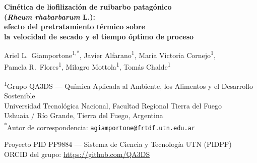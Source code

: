\documentclass[12pt, a4paper]{article}
\begin{document}
\thispagestyle{empty}
\begin{center}
\end{center}
\vspace{1em}

\begin{center}
{\LARGE\bfseries Cinética de liofilización de ruibarbo patagónico\\
(\textit{Rheum rhabarbarum} L.):\\
efecto del pretratamiento térmico sobre\\
la velocidad de secado y el tiempo óptimo de proceso}
\vspace{1.5em}

{\large
Ariel L.\ Giamportone\textsuperscript{1,*},
Javier Alfarano\textsuperscript{1},
María Victoria Cornejo\textsuperscript{1},\\
Pamela R.\ Flores\textsuperscript{1},
Milagro Mottola\textsuperscript{1},
Tomás Chalde\textsuperscript{1}}
\vspace{1em}

{\small
\textsuperscript{1}Grupo QA3DS — Química Aplicada al Ambiente, los Alimentos y el Desarrollo Sostenible\\
Universidad Tecnológica Nacional, Facultad Regional Tierra del Fuego\\
Ushuaia / Río Grande, Tierra del Fuego, Argentina\\[0.5em]
\textsuperscript{*}Autor de correspondencia: \texttt{agiamportone@frtdf.utn.edu.ar}}
\vspace{1em}

{\small Proyecto PID PP9884 — Sistema de Ciencia y Tecnología UTN (PIDPP)\\
ORCID del grupo: \url{https://github.com/QA3DS}}

\end{center}
\vspace{2em}
\end{document}

